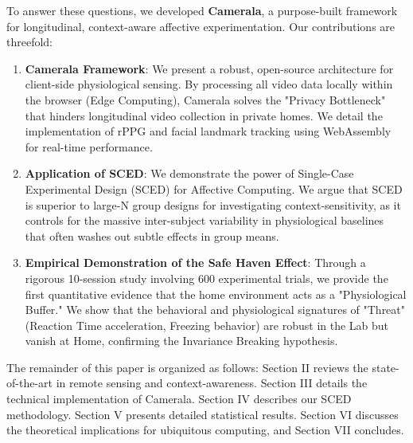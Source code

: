\documentclass[journal]{IEEEtran}
\begin{document}
To answer these questions, we developed \textbf{Camerala}, a purpose-built framework for longitudinal, context-aware affective experimentation. 
Our contributions are threefold:

\begin{enumerate}
    \item \textbf{Camerala Framework}: We present a robust, open-source architecture for client-side physiological sensing. 
    By processing all video data locally within the browser (Edge Computing), Camerala solves the "Privacy Bottleneck" 
    that hinders longitudinal video collection in private homes. We detail the implementation of rPPG and facial landmark tracking 
    using WebAssembly for real-time performance.
    
    \item \textbf{Application of SCED}: We demonstrate the power of Single-Case Experimental Design (SCED) \cite{barlow_sced} for Affective Computing. 
    We argue that SCED is superior to large-N group designs for investigating context-sensitivity, 
    as it controls for the massive inter-subject variability in physiological baselines that often washes out subtle effects in group means.
    
    \item \textbf{Empirical Demonstration of the Safe Haven Effect}: Through a rigorous 10-session study involving 600 experimental trials, 
    we provide the first quantitative evidence that the home environment acts as a "Physiological Buffer." 
    We show that the behavioral and physiological signatures of "Threat" (Reaction Time acceleration, Freezing behavior) 
    are robust in the Lab but vanish at Home, confirming the Invariance Breaking hypothesis.
\end{enumerate}

The remainder of this paper is organized as follows: Section II reviews the state-of-the-art in remote sensing and context-awareness. 
Section III details the technical implementation of Camerala. Section IV describes our SCED methodology. 
Section V presents detailed statistical results. Section VI discusses the theoretical implications for ubiquitous computing, and Section VII concludes.

\end{document}
